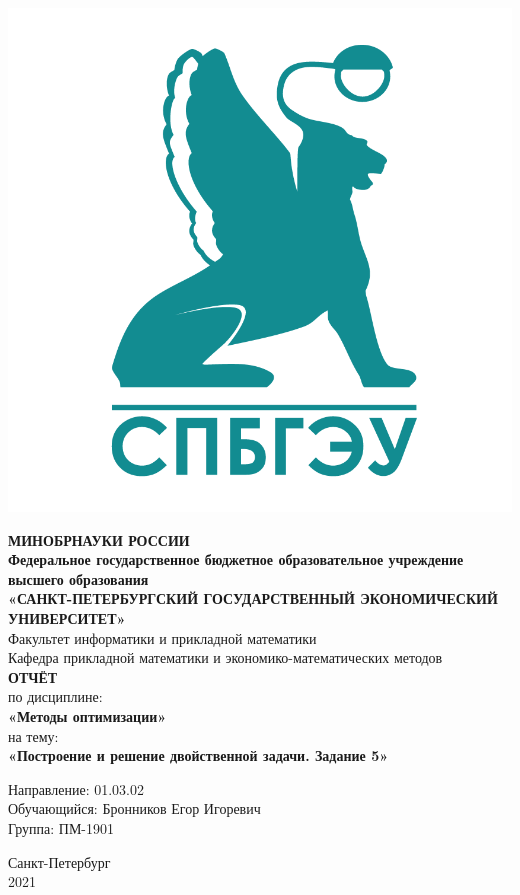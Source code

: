 \documentclass[14pt,a4paper,fleqn]{extarticle}
\begin{document}
	\begin{titlepage}
		\includegraphics[scale=0.12]{logo}
		\begin{center}
			\textbf{МИНОБРНАУКИ РОССИИ}\\
			\vspace{0.2cm}
			\textbf{Федеральное государственное бюджетное образовательное учреждение высшего образования}\\
			\textbf{«САНКТ-ПЕТЕРБУРГСКИЙ ГОСУДАРСТВЕННЫЙ ЭКОНОМИЧЕСКИЙ УНИВЕРСИТЕТ»}\\
			\vspace{0.6cm}
			Факультет информатики и прикладной математики\\
			Кафедра прикладной математики и экономико-математических методов\\
			\vspace{1cm}
			\textbf{ОТЧЁТ}\\
			по дисциплине:\\
			\textbf{«Методы оптимизации»}\\
			на тему:\\
			\textbf{«Построение и решение двойственной задачи. Задание 5»}\\
		\end{center}
		\vspace{1cm}
		Направление: 01.03.02\\
		Обучающийся: Бронников Егор Игоревич\\
		Группа: ПМ-1901\\
		\vfill
		\begin{center}
			Санкт-Петербург\\
			2021\\
		\end{center}
	\end{titlepage}
\end{document}
